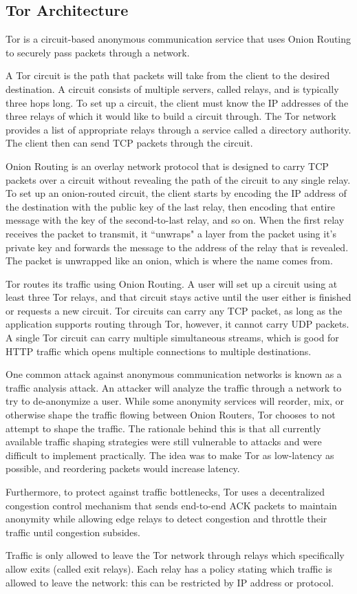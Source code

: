 \documentclass[12pt,journal]{IEEEtran}
\begin{document}
\subsection{Tor Architecture}
Tor is a circuit-based anonymous communication service that uses Onion Routing to securely pass packets through a network.
\par
A Tor circuit is the path that packets will take from the client to the desired destination. A circuit consists of multiple servers, called relays, and is typically three hops long. To set up a circuit, the client must know the IP addresses of the three relays of which it would like to build a circuit through. The Tor network provides a list of appropriate relays through a service called a directory authority. The client then can send TCP packets through the circuit.
\par
Onion Routing is an overlay network protocol that is designed to carry TCP packets over a circuit without revealing the path of the circuit to any single relay. To set up an onion-routed circuit, the client starts by encoding the IP address of the destination with the public key of the last relay, then encoding that entire message with the key of the second-to-last relay, and so on. When the first relay receives the packet to transmit, it ``unwraps" a layer from the packet using it's private key and forwards the message to the address of the relay that is revealed. The packet is unwrapped like an onion, which is where the name comes from.
\par
Tor routes its traffic using Onion Routing. A user will set up a circuit using at least three Tor relays, and that circuit stays active until the user either is finished or requests a new circuit. Tor circuits can carry any TCP packet, as long as the application supports routing through Tor, however, it cannot carry UDP packets. A single Tor circuit can carry multiple simultaneous streams, which is good for HTTP traffic which opens multiple connections to multiple destinations.
\par
One common attack against anonymous communication networks is known as a traffic analysis attack. An attacker will analyze the traffic through a network to try to de-anonymize a user. While some anonymity services will reorder, mix, or otherwise shape the traffic flowing between Onion Routers, Tor chooses to not attempt to shape the traffic. The rationale behind this is that all currently available traffic shaping strategies were still vulnerable to attacks and were difficult to implement practically. The idea was to make Tor as low-latency as possible, and reordering packets would increase latency.
\par
Furthermore, to protect against traffic bottlenecks, Tor uses a decentralized congestion control mechanism that sends end-to-end ACK packets to maintain anonymity while allowing edge relays to detect congestion and throttle their traffic until congestion subsides.
\par
Traffic is only allowed to leave the Tor network through relays which specifically allow exits (called exit relays). Each relay has a policy stating which traffic is allowed to leave the network: this can be restricted by IP address or protocol. \cite{Dingledine:2004:TSO:1251375.1251396}
\end{document}

